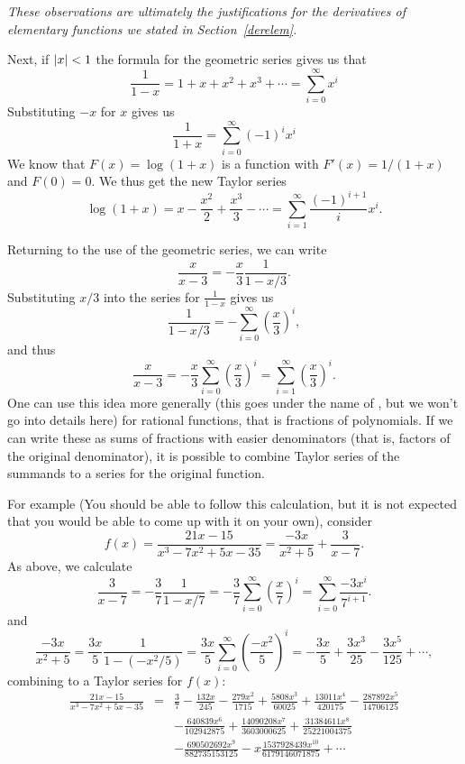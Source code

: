 {\em These observations are ultimately the
justifications for the derivatives of elementary functions we stated in
Section~\ref{derelem}.}
\smallskip

Next, if $\left|x\right|<1$ the formula for the geometric series gives us that
\[
\frac{1}{1-x}=1+x+x^2+x^3+\cdots=\sum_{i=0}^\infty x^i
\]
Substituting $-x$ for $x$ gives us
\[
\frac{1}{1+x}=\sum_{i=0}^\infty (-1)^i x^i
\]
We know that $F(x)=\log(1+x)$ is a function with $F'(x)=1/(1+x)$ and
$F(0)=0$. We thus get the new Taylor series
\[
\log(1+x)=x-\frac{x^2}{2}+\frac{x^3}{3}-\cdots=\sum_{i=1}^\infty\frac{(-1)^{i+1}}{i}x^i.
\]
\smallskip

Returning to the use of the geometric series, we can write
\[
\frac{x}{x-3}=-\frac{x}{3}\frac{1}{1-x/3}.
\]
Substituting $x/3$ into the series for $\frac{1}{1-x}$ gives us
\[
\frac{1}{1-x/3}=-\sum_{i=0}^\infty \left(\frac{x}{3}\right)^i,
\]
and thus
\[
\frac{x}{x-3}= -\frac{x}{3}\sum_{i=0}^\infty \left(\frac{x}{3}\right)^i
= \sum_{i=1}^\infty \left(\frac{x}{3}\right)^i.
\]
One can use this idea more generally (this goes under the name of
, but we won't go into details here) for rational
functions, that is fractions of polynomials. If we can write these as sums
of fractions with easier denominators (that is, factors of the original
denominator), it is possible to combine Taylor series of the summands to a
series for the original function.

For example (You should be able to follow this calculation, but it is not
expected that you would be able to come up with it on your own), consider
\[
f(x)=\frac{21x-15}{x^3-7x^2+5x-35}=\frac{-3x}{x^2+5}+\frac{3}{x-7}.
\]
As above, we calculate
\[
\frac{3}{x-7}=-\frac{3}{7}\frac{1}{1-x/7}=-\frac{3}{7}
\sum_{i=0}^\infty \left(\frac{x}{7}\right)^i
=\sum_{i=0}^\infty \frac{-3x^i}{7^{i+1}}.
\]
and
\[
\frac{-3x}{x^2+5}=\frac{3x}{5}\frac{1}{1-(-x^2/5)}=\frac{3x}{5}
\sum_{i=0}^\infty \left(\frac{-x^2}{5}\right)^i
=-\frac{3x}{5}
+\frac{3x^3}{25}
-\frac{3x^5}{125}+\cdots,
\]
combining to a Taylor series for $f(x)$:
\begin{eqnarray*}
\frac{21x-15}{x^3-7x^2+5x-35}&=&
\frac{3}{7}-\frac{132 x}{245}-\frac{279 x^{2}}{1715}+\frac{5808
x^{3}}{60025}+\frac{13011 x^{4}}{420175}-\frac{287892 x^{5}}{14706125}\\
&&-\frac{640839 x^{6}}{102942875}+\frac{14090208 x^{7}}{3603000625}
+\frac{31384611 x^{8}}{25221004375}\\
&&-\frac{690502692 x^{9}}{882735153125}-
x\frac{1537928439 x^{10}}{6179146071875}
+\cdots
\end{eqnarray*}

